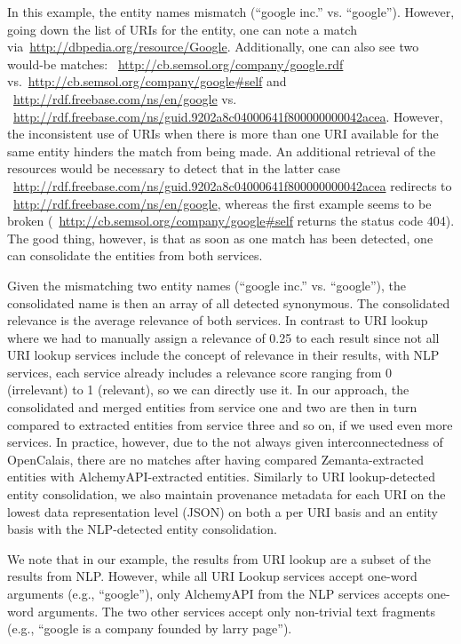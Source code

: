 \documentclass[conference]{IEEEtran}
\newcommand{\nofootnote}[1]{~#1}
\begin{document}
In this example, the entity names mismatch (``google inc.'' vs. ``google''). However, going down the list of URIs for
the entity, one can note a match via\nofootnote{\url{http://dbpedia.org/resource/Google}}. Additionally, one can also
see two would-be matches: \nofootnote{\url{http://cb.semsol.org/company/google.rdf}}
vs.\nofootnote{\url{http://cb.semsol.org/company/google#self}} and
\nofootnote{\url{http://rdf.freebase.com/ns/en/google}} vs.
\nofootnote{\url{http://rdf.freebase.com/ns/guid.9202a8c04000641f800000000042acea}}. However, the inconsistent use of
URIs when there is more than one URI available for the same entity hinders the match from being made. An additional
retrieval of the resources would be necessary to detect that in the latter case
\nofootnote{\url{http://rdf.freebase.com/ns/guid.9202a8c04000641f800000000042acea}} redirects to
\nofootnote{\url{http://rdf.freebase.com/ns/en/google}}, whereas the first example seems to be broken
(\nofootnote{\url{http://cb.semsol.org/company/google#self}} returns the status code 404). The good thing, however, is
that as soon as one match has been detected, one can consolidate the entities from both services.

Given the mismatching two entity names (``google inc.'' vs. ``google''), the consolidated name is then an array of all
detected synonymous. The consolidated relevance is the average relevance of both services. In contrast to URI lookup
where we had to manually assign a relevance of 0.25 to each result since not all URI lookup services include the
concept of relevance in their results, with NLP services, each service already includes a relevance score ranging from
0 (irrelevant) to 1 (relevant), so we can directly use it. In our approach, the consolidated and merged entities from
service one and two are then in turn compared to extracted entities from service three and so on, if we used even more
services. In practice, however, due to the not always given interconnectedness of OpenCalais, there are no matches
after having compared Zemanta-extracted entities with AlchemyAPI-extracted entities. Similarly to URI lookup-detected
entity consolidation, we also maintain provenance metadata for each URI on the lowest data representation level (JSON)
on both a per URI basis and an entity basis with the NLP-detected entity consolidation.

We note that in our example, the results from URI lookup are a subset of the results from NLP. However, while all URI
Lookup services accept one-word arguments (e.g., ``google''), only AlchemyAPI from the NLP services accepts one-word
arguments. The two other services accept only non-trivial text fragments (e.g., ``google is a company founded by larry
page'').
\end{document}
